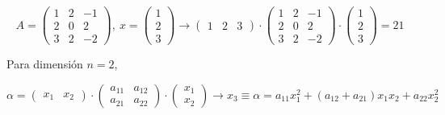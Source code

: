 \begin{equation*}
A=\begin{pmatrix}
1& 2& -1\\
2& 0& 2\\
3& 2& -2
\end{pmatrix}, \ x=\begin{pmatrix}
1\\
2\\
3
\end{pmatrix} \rightarrow \begin{pmatrix}
1& 2& 3
\end{pmatrix} \cdot \begin{pmatrix}
1& 2& -1\\
2& 0& 2\\
3& 2& -2
\end{pmatrix} \cdot \begin{pmatrix}
1\\
2\\
3
\end{pmatrix}= 21
\end{equation*}
\begin{paracol}{2}
Para dimensión $n=2$,
\end{paracol}
\begin{equation*}
\alpha =\begin{pmatrix}
x_1& x_2
\end{pmatrix}\cdot \begin{pmatrix}
a_{11}& a_{12}\\
a_{21}& a_{22}
\end{pmatrix}\cdot \begin{pmatrix}
x_1\\
x_2
\end{pmatrix} \rightarrow x_3\equiv \alpha=a_{11}x_1^2+(a_{12}+a_{21})x_1x_2+a_{22}x_2^2
\end{equation*}

